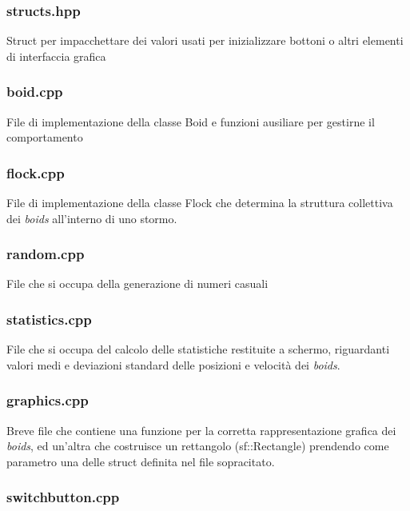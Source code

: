 \documentclass[10pt,a4paper]{article}
\begin{document}
\subsubsection{structs.hpp}

Struct per impacchettare dei valori usati per inizializzare bottoni o altri elementi di interfaccia grafica

\subsubsection{boid.cpp}

File di implementazione della classe Boid e funzioni ausiliare per gestirne il comportamento

\subsubsection{flock.cpp}

File di implementazione della classe Flock che determina la struttura collettiva dei \textit{boids} all'interno di uno stormo.

\subsubsection{random.cpp}

File che si occupa della generazione di numeri casuali

\subsubsection{statistics.cpp}

File che si occupa del calcolo delle statistiche restituite a schermo, riguardanti valori medi e deviazioni standard delle posizioni e velocità dei \textit{boids}.

\subsubsection{graphics.cpp}

Breve file che contiene una funzione per la corretta rappresentazione grafica dei \textit{boids}, ed un'altra che costruisce un rettangolo (sf::Rectangle) prendendo come parametro una delle struct definita nel file sopracitato.

\subsubsection{switchbutton.cpp}
\end{document}

